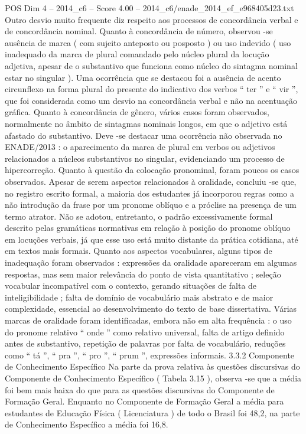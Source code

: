 \begin{textsample}{POS Dim 4 – 2014\_c6 – Score 4.00 – 2014\_c6/enade\_2014\_ef\_e968405d23.txt}
Outro desvio muito frequente diz respeito aos processos de concordância verbal e de concordância nominal.
Quanto à concordância de número, observou -se ausência de marca ( com sujeito anteposto ou posposto ) ou uso indevido ( uso inadequado da marca de plural comandado pelo núcleo plural da locução adjetiva, apesar de o substantivo que funciona como núcleo do sintagma nominal estar no singular ).
Uma ocorrência que se destacou foi a ausência de acento circunflexo na forma plural do presente do indicativo dos verbos “ ter ” e “ vir ”, que foi considerada como um desvio na concordância verbal e não na acentuação gráfica.
Quanto à concordância de gênero, vários casos foram observados, normalmente no âmbito de sintagmas nominais longos, em que o adjetivo está afastado do substantivo.
Deve -se destacar uma ocorrência não observada no ENADE/2013 : o aparecimento da marca de plural em verbos ou adjetivos relacionados a núcleos substantivos no singular, evidenciando um processo de hipercorreção.
Quanto à questão da colocação pronominal, foram poucos os casos observados.
Apesar de serem aspectos relacionados à oralidade, concluiu -se que, no registro escrito formal, a maioria dos estudantes já incorporou regras como a não introdução da frase por um pronome oblíquo e a próclise na presença de um termo atrator.
Não se adotou, entretanto, o padrão excessivamente formal descrito pelas gramáticas normativas em relação à posição do pronome oblíquo em locuções verbais, já que esse uso está muito distante da prática cotidiana, até em textos mais formais.
Quanto aos aspectos vocabulares, alguns tipos de inadequação foram observados : expressões da oralidade apareceram em algumas respostas, mas sem maior relevância do ponto de vista quantitativo ; seleção vocabular incompatível com o contexto, gerando situações de falta de inteligibilidade ; falta de domínio de vocabulário mais abstrato e de maior complexidade, essencial ao desenvolvimento do texto de base dissertativa.
Várias marcas de oralidade foram identificadas, embora não em alta frequência : o uso do pronome relativo “ onde ” como relativo universal, falta de artigo definido antes de substantivo, repetição de palavras por falta de vocabulário, reduções como “ tá ”, “ pra ”, “ pro ”, “ prum ”, expressões informais. 3.3.2 Componente de Conhecimento Específico Na parte da prova relativa às questões discursivas do Componente de Conhecimento Específico ( Tabela 3.15 ), observa -se que a média foi bem mais baixa do que para as questões discursivas do Componente de Formação Geral.
Enquanto no Componente de Formação Geral a média para estudantes de Educação Física ( Licenciatura ) de todo o Brasil foi 48,2, na parte de Conhecimento Específico a média foi 16,8.

\end{textsample}
